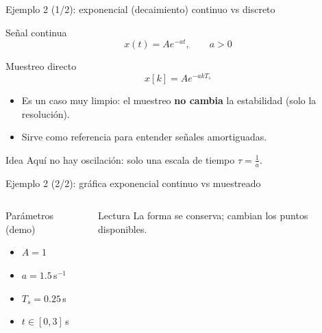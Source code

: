 \documentclass[aspectratio=169,10pt]{beamer}
\newcommand{\importantbox}[2][Importante]{%
\begin{alertblock}{#1}#2\end{alertblock}}
\begin{document}
\begin{frame}{Ejemplo 2 (1/2): exponencial (decaimiento) continuo vs discreto}
\small

\begin{block}{Señal continua}
\[
x(t)=A e^{-a t},\qquad a>0
\]
\end{block}

\begin{block}{Muestreo directo}
\[
x[k]=A e^{-a k T_s}
\]
\end{block}

\begin{itemize}
\item Es un caso muy limpio: el muestreo \textbf{no cambia} la estabilidad (solo la resolución).
\item Sirve como referencia para entender señales amortiguadas.
\end{itemize}

\importantbox[Idea]{
Aquí no hay oscilación: solo una escala de tiempo $\tau=\frac{1}{a}$.
}
\end{frame}

\begin{frame}{Ejemplo 2 (2/2): gráfica exponencial continuo vs muestreado}
\small
\begin{columns}[T]
\begin{block}{Parámetros (demo)}
\begin{itemize}
\item $A=1$
\item $a=1.5\,$s$^{-1}$
\item $T_s=0.25\,$s
\item $t \in [0,3]\,$s
\end{itemize}
\end{block}
\importantbox[Lectura]{
La forma se conserva; cambian los puntos disponibles.
}

\end{columns}
\end{frame}
\end{document}
